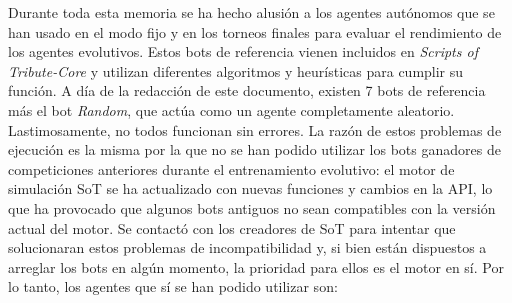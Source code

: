 Durante toda esta memoria se ha hecho alusión a los agentes autónomos que se han usado en el modo fijo y en los torneos finales para evaluar el rendimiento de los agentes evolutivos. Estos bots de referencia vienen incluidos en \textit{Scripts of Tribute-Core} y utilizan diferentes algoritmos y heurísticas para cumplir su función. A día de la redacción de este documento, existen 7 bots de referencia más el bot \textit{Random}, que actúa como un agente completamente aleatorio. Lastimosamente, no todos funcionan sin errores. La razón de estos problemas de ejecución es la misma por la que no se han podido utilizar los bots ganadores de competiciones anteriores durante el entrenamiento evolutivo: el motor de simulación SoT se ha actualizado con nuevas funciones y cambios en la API, lo que ha provocado que algunos bots antiguos no sean compatibles con la versión actual del motor. Se contactó con los creadores de SoT para intentar que solucionaran estos problemas de incompatibilidad y, si bien están dispuestos a arreglar los bots en algún momento, la prioridad para ellos es el motor en sí. Por lo tanto, los agentes que sí se han podido utilizar son:

